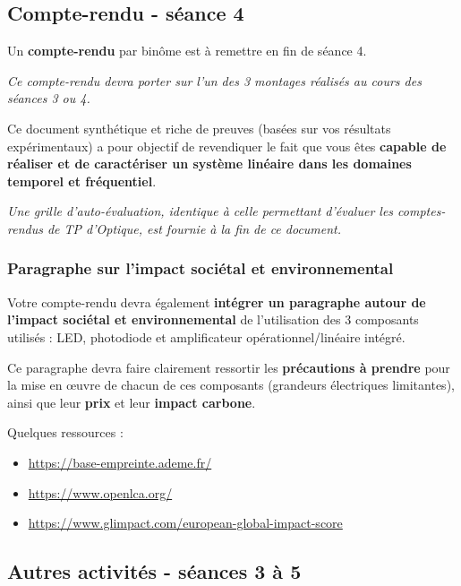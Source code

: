 \documentclass[a4paper,11pt,twoside]{book} %
\begin{document}
{\subsection{Compte-rendu - séance 4}

Un \textbf{compte-rendu} par binôme est à remettre en fin de séance 4.

\textit{Ce compte-rendu devra porter sur l'un des 3 montages réalisés au cours des séances 3 ou 4.}

Ce document synthétique et riche de preuves (basées sur vos résultats expérimentaux) a pour objectif de revendiquer le fait que vous êtes \textbf{capable de réaliser et de caractériser un système linéaire dans les domaines temporel et fréquentiel}.

\textit{Une grille d'auto-évaluation, identique à celle permettant d'évaluer les comptes-rendus de TP d'Optique, est fournie à la fin de ce document.}

\subsubsection{Paragraphe sur l'impact sociétal et environnemental}

Votre compte-rendu devra également \textbf{intégrer un paragraphe autour de l'impact sociétal et environnemental} de l'utilisation des 3 composants utilisés : LED, photodiode et amplificateur opérationnel/linéaire intégré.

Ce paragraphe devra faire clairement ressortir les \textbf{précautions à prendre} pour la mise en \oe{}uvre de chacun de ces composants (grandeurs électriques limitantes), ainsi que leur \textbf{prix} et leur \textbf{impact carbone}.


Quelques ressources :

\begin{itemize}
	\item \href{https://base-empreinte.ademe.fr/}{https://base-empreinte.ademe.fr/}
	\item \href{https://www.openlca.org/}{https://www.openlca.org/}
	\item \href{https://www.glimpact.com/european-global-impact-score}{https://www.glimpact.com/european-global-impact-score}
\end{itemize}

\subsection{Autres activités - séances 3 à 5}

}
\end{document}
